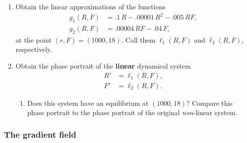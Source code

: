 \begin{enumerate}
\item Obtain the linear approximations of the functions
\begin{align*}
g_1(R, F) &= .1\,R  - .00001\,R^2 - .005\,RF,   \\
g_2(R, F) &= .00004\,RF - .04\,F,
\end{align*}
at the point $(r, F) = (1000, 18)$.  Call them $\ell_1(R, F)$ and
$\ell_2(R, F)$, respectively.


\item Obtain the phase portrait of the {\bf linear} dynamical system
\begin{align*}
R' &= \ell_1(R, F),   \\
F' &= \ell_2(R, F).
\end{align*}



  \begin{enumerate}
  \item Does this system have an equilibrium at $(1000, 18)$?  Compare
this phase portrait to the phase portrait of the original {\em
  non\/}-linear system.




\end{enumerate}
\end{enumerate}
\subsubsection{The gradient field}
\label{subsubsec:the-gradient-field}



